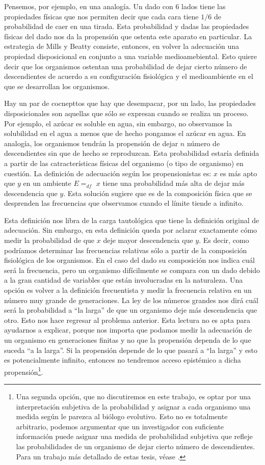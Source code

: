 Pensemos, por ejemplo, en una analogía. Un dado con 6 lados tiene las propiedades físicas que nos permiten decir que cada cara tiene $1/6$ de probabilidad de caer en una tirada. Esta probabilidad y dadas las propiedades físicas del dado nos da la propensión que ostenta este aparato en particular. La estrategia de Mills y Beatty consiste, entonces, en volver la adecuación una propiedad disposicional en conjunto a una variable medioamebiental. Esto quiere decir que los organismos ostentan una probabilidad de dejar cierto número de descendientes de acuerdo a su configuración fisiológica y el medioambiente en el que se desarrollan los organismos.

Hay un par de cocnepttos que hay que desempacar, por un lado, las propiedades disposicionales son aquellas que sólo se expresan cuando se realiza un proceso. Por ejemplo, el azúcar es soluble en agua, sin embargo, no observamos la solubilidad en el agua a menos que de hecho pongamos el azúcar en agua. En analogía, los organismos tendrán la propensión de dejar $n$ número de descendientes sin que de hecho se reproduzcan. Esta probabilidad estaría definida a partir de las catracterísticas físicas del organismo (o tipo de organismo) en cuestión. La definición de adecuación según los propensionistas es: $x$ es más apto que $y$ en un ambiente $E =_{df}$ $x$ tiene una probabilidad más alta de dejar más descendencia que $y$. Esta solución sugiere que es de la composición física que se desprenden las frecuencias que observamos cuando el límite tiende a infinito.

Esta definición nos libra de la carga tautológica que tiene la definición original de adecuación. Sin embargo, en esta definición queda por aclarar exactamente cómo medir la probabilidad de que $x$ deje mayor descendencia que $y$. Es decir, como podríamos determinar las frecuencias relativas sólo a partir de la composición fisiológica de los organismos. En el caso del dado su composición nos indica cuál será la frecuencia, pero un organismo difícilmente se compara con un dado debido a la gran cantidad de variables que están involucradas en la naturaleza. Una opción es volver a la definición frecuentista y medir la frecuencia relativa en un número muy grande de generaciones. La ley de los números grandes nos dirá cuál será la probabilidad a ``la larga'' de que un organismo deje más descendencia que otro. Esto nos hace regresar al problema anterior. Esta lectura no es apta para ayudarnos a explicar, porque nos importa que podamos medir la adecuación de un organismo en generaciones finitas y no que la propensión dependa de lo que suceda ``a la larga''. Si la propensión depende de lo que pasará a ``la larga'' y esto es potencialmente infinito, entonces no tendremos acceso epistémico a dicha propensión\footnote{Una segunda opción, que no discutiremos en este trabajo, es optar por una interpretación subjetiva de la probabilidad y asignar a cada organismo una medida según le parezca al biólogo evolutivo. Esto no es totalmente arbitrario, podemos argumentar que un investigador con suficiente información puede asignar una medida de probabilidad subjetiva que refleje las probabilidades de un organismo de dejar cierto número de descendientes. Para un trabajo más detallado de estas tesis, véase \cite{Suarez2021}.}.


